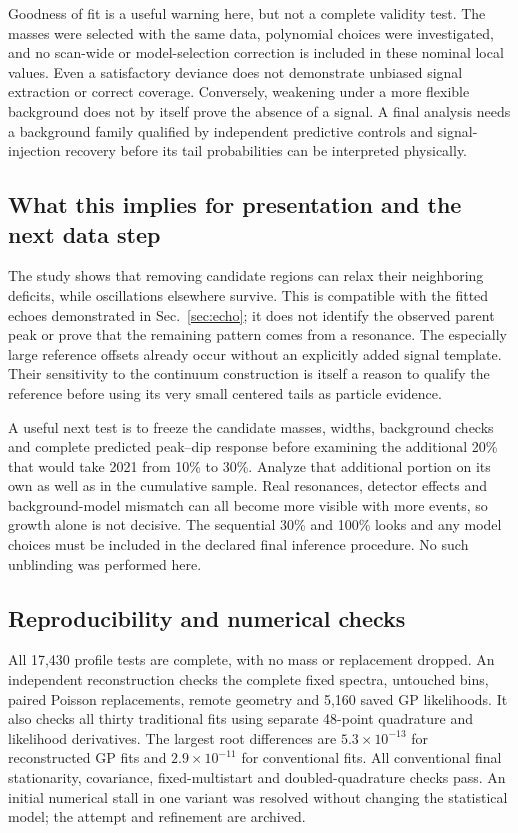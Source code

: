 Goodness of fit is a useful warning here, but not a complete validity test. The masses were selected with the same data, polynomial choices were investigated, and no scan-wide or model-selection correction is included in these nominal local values. Even a satisfactory deviance does not demonstrate unbiased signal extraction or correct coverage. Conversely, weakening under a more flexible background does not by itself prove the absence of a signal. A final analysis needs a background family qualified by independent predictive controls and signal-injection recovery before its tail probabilities can be interpreted physically.

\subsection{What this implies for presentation and the next data step}
The study shows that removing candidate regions can relax their neighboring deficits, while oscillations elsewhere survive. This is compatible with the fitted echoes demonstrated in Sec.~\ref{sec:echo}; it does not identify the observed parent peak or prove that the remaining pattern comes from a resonance. The especially large reference offsets already occur without an explicitly added signal template. Their sensitivity to the continuum construction is itself a reason to qualify the reference before using its very small centered tails as particle evidence.

A useful next test is to freeze the candidate masses, widths, background checks and complete predicted peak--dip response before examining the additional 20\% that would take 2021 from 10\% to 30\%. Analyze that additional portion on its own as well as in the cumulative sample. Real resonances, detector effects and background-model mismatch can all become more visible with more events, so growth alone is not decisive. The sequential 30\% and 100\% looks and any model choices must be included in the declared final inference procedure. No such unblinding was performed here.

\subsection{Reproducibility and numerical checks}
All 17,430 profile tests are complete, with no mass or replacement dropped. An independent reconstruction checks the complete fixed spectra, untouched bins, paired Poisson replacements, remote geometry and 5,160 saved GP likelihoods. It also checks all thirty traditional fits using separate 48-point quadrature and likelihood derivatives. The largest root differences are $5.3\times10^{-13}$ for reconstructed GP fits and $2.9\times10^{-11}$ for conventional fits. All conventional final stationarity, covariance, fixed-multistart and doubled-quadrature checks pass. An initial numerical stall in one variant was resolved without changing the statistical model; the attempt and refinement are archived.

